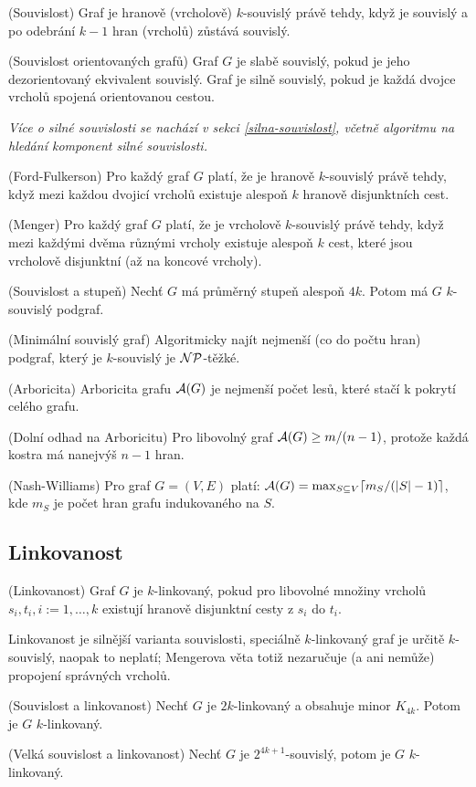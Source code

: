\df (Souvislost) Graf je hranově (vrcholově) $k$-souvislý právě tehdy, když je 
souvislý a po odebrání $k-1$ hran (vrcholů) zůstává souvislý.

\df (Souvislost orientovaných grafů) Graf $G$ je slabě souvislý, pokud je jeho 
dezorientovaný ekvivalent souvislý. Graf je silně souvislý, pokud je každá 
dvojce vrcholů spojená orientovanou cestou.

{\it Více o silné souvislosti se nachází v sekci \ref{silna-souvislost}, včetně 
algoritmu na hledání komponent silné souvislosti.}

\vt (Ford-Fulkerson) Pro každý graf $G$ platí, že je hranově $k$-souvislý právě 
tehdy, když mezi každou dvojicí vrcholů existuje alespoň $k$ hranově 
disjunktních cest.

\vt (Menger) Pro každý graf $G$ platí, že je vrcholově $k$-souvislý právě 
tehdy, když mezi každými dvěma různými vrcholy existuje alespoň $k$ cest, které 
jsou vrcholově disjunktní (až na koncové vrcholy).

\vt (Souvislost a stupeň) Nechť $G$ má průměrný stupeň alespoň $4k$. Potom má 
$G$ $k$-souvislý podgraf.

\vt (Minimální souvislý graf) Algoritmicky najít nejmenší (co do počtu hran) 
podgraf, který je $k$-souvislý je $\mathcal{NP}$-těžké.

\df (Arboricita) Arboricita grafu $\mathcal{A}(G)$ je nejmenší počet lesů, které stačí k 
pokrytí celého grafu.

\poz (Dolní odhad na Arboricitu) Pro libovolný graf $\mathcal{A}(G) \geq m/(n-1)$, 
protože každá kostra má nanejvýš $n-1$ hran.

\vt (Nash-Williams) Pro graf $G=(V,E)$ platí: $\mathcal{A}(G) = \max_{S \subseteq V} 
\lceil m_S / (|S| -1 ) \rceil$, kde $m_S$ je počet hran grafu indukovaného na 
$S$.

\subsection{Linkovanost}

\df (Linkovanost) Graf $G$ je $k$-linkovaný, pokud pro libovolné množiny 
vrcholů $s_i, t_i, i := 1,\dots, k$ existují hranově disjunktní cesty z $s_i$ 
do $t_i$.

\pzn Linkovanost je silnější varianta souvislosti, speciálně $k$-linkovaný graf 
je určitě $k$-souvislý, naopak to neplatí; Mengerova věta totiž nezaručuje (a 
ani nemůže) propojení správných vrcholů.

\vt (Souvislost a linkovanost) Nechť $G$ je $2k$-linkovaný a obsahuje minor 
$K_{4k}$. Potom je $G$ $k$-linkovaný.

\vt (Velká souvislost a linkovanost) Nechť $G$ je $2^{4k+1}$-souvislý, potom je 
$G$ $k$-linkovaný.



